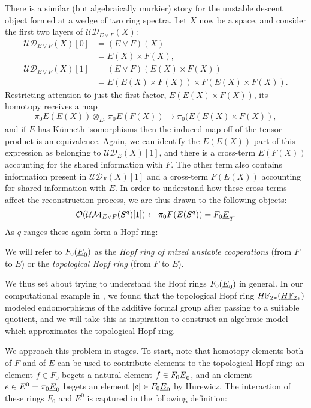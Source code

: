 There is a similar (but algebraically murkier) story for the unstable descent object formed at a wedge of two ring spectra.  Let \(X\) now be a space, and consider the first two layers of \(\mathcal{UD}_{E \vee F}(X)\):
\begin{align*}
\mathcal{UD}_{E \vee F}(X)[0] & = (E \vee F)(X) \\
& = E(X) \times F(X), \\
\mathcal{UD}_{E \vee F}(X)[1] & = (E \vee F)(E(X) \times F(X)) \\
& = E(E(X) \times F(X)) \times F(E(X) \times F(X)).
\end{align*}
Restricting attention to just the first factor, \(E(E(X) \times F(X))\), its homotopy receives a map \[\pi_0 E(E(X)) \otimes_{E_0} \pi_0 E(F(X)) \to \pi_0(E(E(X) \times F(X)),\] and if \(E\) has K\"unneth isomorphisms then the induced map off of the tensor product is an equivalence.  Again, we can identify the \(E(E(X))\) part of this expression as belonging to \(\mathcal{UD}_E(X)[1]\), and there is a cross-term \(E(F(X))\) accounting for the shared information with \(F\).  The other term also contains information present in \(\mathcal{UD}_F(X)[1]\) and a cross-term \(F(E(X))\) accounting for shared information with \(E\).  In order to understand how these cross-terms affect the reconstruction process, we are thus drawn to the following objects: \[\sheaf O(\Ucontext{E \vee F}(S^q)[1]) \leftarrow \pi_0 F(E(S^q)) = F_0 \OS{E}{q}.\]  As \(q\) ranges these again form a Hopf ring:

\begin{definition}
We will refer to \(F_0(\OS{E}{0})\) as the \textit{Hopf ring of mixed unstable cooperations} (from \(F\) to \(E\)) or the \textit{topological Hopf ring} (from \(F\) to \(E\)).
\end{definition}

We thus set about trying to understand the Hopf rings \(F_0(\OS{E}{0})\) in general.  In our computational example in , we found that the topological Hopf ring \(\HFtwo_*(\OS{\HFtwo}{*})\) modeled endomorphisms of the additive formal group after passing to a suitable quotient, and we will take this as inspiration to construct an algebraic model which approximates the topological Hopf ring.

We approach this problem in stages.  To start, note that homotopy elements both of \(F\) and of \(E\) can be used to contribute elements to the topological Hopf ring: an element \(f \in F_0\) begets a natural element \(f \in F_0 \OS{E}{0}\), and an element \(e \in E^0 = \pi_0 \OS{E}{0}\) begets an element \([e] \in F_0 \OS{E}{0}\) by Hurewicz.  The interaction of these rings \(F_0\) and \(E^0\) is captured in the following definition:

